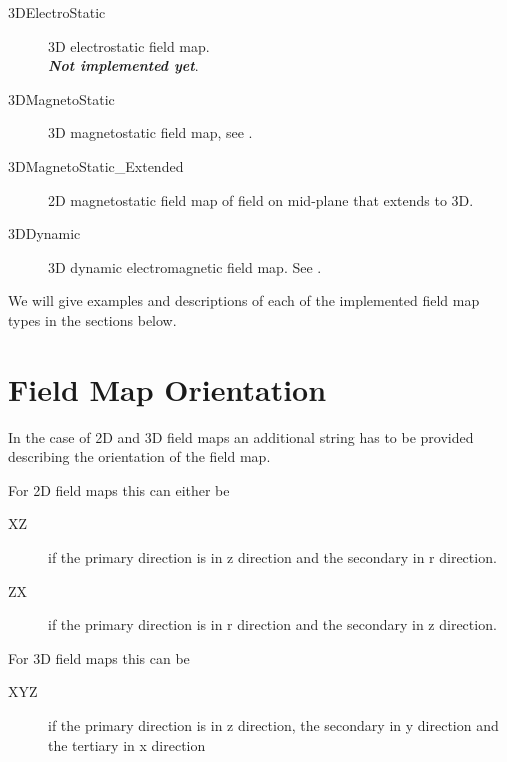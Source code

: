 \begin{description}
\item[3DElectroStatic] \Newline
3D electrostatic field map.\\
\textbf{\emph{Not implemented yet}}.

\item[3DMagnetoStatic] \Newline
3D magnetostatic field map, see .

\item[{3DMagnetoStatic\_Extended}] \Newline
2D magnetostatic field map of field on mid-plane that \opal extends to 3D.

\item[3DDynamic] \Newline
3D dynamic electromagnetic field map. See .
\end{description}

We will give examples and descriptions of each of the implemented field map types in the sections below.

\section{Field Map Orientation}
\label{sec:fieldorientation}
In the case of 2D and 3D field maps an additional string has to be provided describing the orientation of the field map.

For 2D field maps this can either be
\begin{description}
\item[XZ]\Newline
if the primary direction is in z direction and the secondary in r direction.
\item[ZX]\Newline
if the primary direction is in r direction and the secondary in z direction.
\end{description}

For 3D field maps this can be
\begin{description}
\item[XYZ]\Newline
if the primary direction is in z direction, the secondary in y direction and the tertiary in x direction
\end{description}

